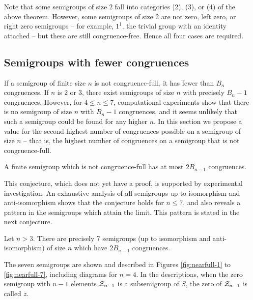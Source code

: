 Note that some semigroups of size $2$ fall into categories (2), (3), or (4) of
the above theorem.  However, some semigroups of size 2 are not zero, left zero,
or right zero semigroups -- for example, $1^1$, the trivial group with an
identity attached -- but these are still congruence-free.  Hence all four cases
are required.



\subsection{Semigroups with fewer congruences}

If a semigroup of finite size $n$ is not congruence-full, it has fewer than
$B_n$ congruences.  If $n$ is $2$ or $3$, there exist semigroups of size $n$
with precisely $B_n - 1$ congruences.  However, for $4 \leq n \leq 7$,
computational experiments show that there is no semigroup of size $n$ with
$B_n - 1$ congruences, and it seems unlikely that such a semigroup could be
found for any higher $n$.  In this section we propose a value for the second
highest number of congruences possible on a semigroup of size $n$ -- that is, the
highest number of congruences on a semigroup that is not congruence-full.

\begin{conjecture}
  \label{conj:not-cong-full}
  A finite semigroup which is not congruence-full has at most
  $2B_{n-1}$ congruences.
\end{conjecture}

This conjecture, which does not yet have a proof, is supported by experimental
investigation.  An exhaustive analysis of all semigroups up to isomorphism and
anti-isomorphism shows that the conjecture holds for $n \leq 7$, and also
reveals a pattern in the semigroups which attain the limit.  This pattern is
stated in the next conjecture.

\begin{conjecture}
  \label{conj:cong-nearfull-7}
  Let $n > 3$.  There are precisely 7 semigroups (up to isomorphism and
  anti-isomorphism) of size $n$ which have $2B_{n-1}$ congruences.
\end{conjecture}

The seven semigroups are shown and described in Figures \ref{fig:nearfull-1} to
\ref{fig:nearfull-7}, including diagrams for $n = 4$.  In the descriptions, when
the zero semigroup with $n-1$ elements $\mathcal{Z}_{n-1}$ is a subsemigroup of $S$, the
zero of $\mathcal{Z}_{n-1}$ is called $z$.  


